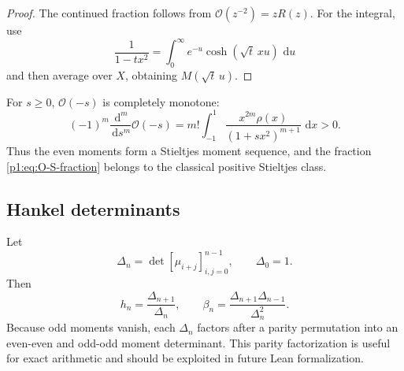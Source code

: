 \documentclass[11pt]{article}
\theoremstyle{definition}
\theoremstyle{remark}
\newcommand{\dd}{\,\mathrm d}
\newcommand{\cO}{\mathcal O}
\begin{document}
\begin{proof}
The continued fraction follows from \(\cO(z^{-2})=zR(z)\).  For the integral, use
\[
 \frac1{1-tx^2}=\int_0^{\infty}e^{-u}\cosh(\sqrt t\,xu)\,\dd u
\]
and then average over \(X\), obtaining \(M(\sqrt t\,u)\).
\end{proof}

For \(s\ge0\), \(\cO(-s)\) is completely monotone:
\begin{equation}
 (-1)^m\frac{\dd^m}{\dd s^m}\cO(-s)
 =m!\int_{-1}^{1}\frac{x^{2m}\rho(x)}{(1+sx^2)^{m+1}}\,\dd x>0. \label{p1:eq:O-complete-monotone}
\end{equation}
Thus the even moments form a Stieltjes moment sequence, and the fraction
\eqref{p1:eq:O-S-fraction} belongs to the classical positive Stieltjes class.

\subsection{Hankel determinants}

Let
\begin{equation}
 \Delta_n=\det[\mu_{i+j}]_{i,j=0}^{n-1},\qquad \Delta_0=1.  \label{p1:eq:Hankel}
\end{equation}
Then
\begin{equation}
 h_n=\frac{\Delta_{n+1}}{\Delta_n},
 \qquad
 \boxed{\beta_n=\frac{\Delta_{n+1}\Delta_{n-1}}{\Delta_n^2}}. \label{p1:eq:beta-Hankel}
\end{equation}
Because odd moments vanish, each \(\Delta_n\) factors after a parity permutation into an
even-even and odd-odd moment determinant.  This parity factorization is useful for exact
arithmetic and should be exploited in future Lean formalization.
\end{document}
